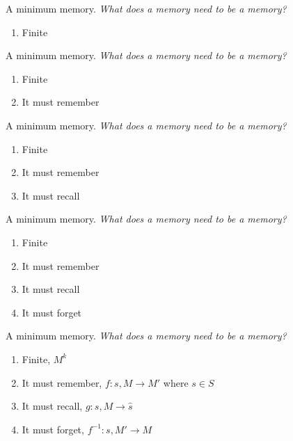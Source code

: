 \documentclass[10pt]{beamer}
\begin{document}
\begin{frame}[fragile]{A minimum memory.}
\textit{What does a memory need to be a memory?}
\begin{enumerate}
    \item Finite
\end{enumerate}
\end{frame}

\begin{frame}[fragile]{A minimum memory.}
\textit{What does a memory need to be a memory?}
\begin{enumerate}
    \item Finite
    \item It must remember
\end{enumerate}
\end{frame}

\begin{frame}[fragile]{A minimum memory.}
\textit{What does a memory need to be a memory?}
\begin{enumerate}
    \item Finite
    \item It must remember
    \item It must recall
\end{enumerate}
\end{frame}

\begin{frame}[fragile]{A minimum memory.}
\textit{What does a memory need to be a memory?}
\begin{enumerate}
    \item Finite
    \item It must remember
    \item It must recall
    \item It must forget
\end{enumerate}
\end{frame}

\begin{frame}[fragile]{A minimum memory.}
\textit{What does a memory need to be a memory?}
\begin{enumerate}
    \item Finite, $M^k$
    \item It must remember, $f : s, M \rightarrow M'$ where $s \in S$
    \item It must recall, $g : s, M \rightarrow \hat s$
    \item It must forget, $f^{-1} : s, M' \rightarrow M$
\end{enumerate}
\end{frame}
\end{document}
